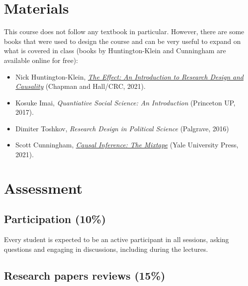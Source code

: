 \documentclass[12pt, a4paper]{article}
\begin{document}
\section{Materials}

This course does not follow any textbook in particular.
However, there are some books that were used to design the course and can be very useful to expand on what is covered in class (books by Huntington-Klein and Cunningham are available online for free):

\begin{itemize}
\setlength\itemsep{-5pt}
  \item Nick Huntington-Klein, \href{https://theeffectbook.net/}{\textit{The Effect: An Introduction to Research Design and Causality}} (Chapman and Hall/CRC, 2021).
  \item Kosuke Imai, \textit{Quantiative Social Science: An Introduction} (Princeton UP, 2017).
  \item Dimiter Toshkov, \textit{Research Design in Political Science} (Palgrave, 2016)
  \item Scott Cunningham, \href{https://mixtape.scunning.com/}{\textit{Causal Inference: The Mixtape}} (Yale University Press, 2021).
\end{itemize}


\section{Assessment}


\subsection*{Participation (10\%)}

Every student is expected to be an active participant in all sessions, asking questions and engaging in discussions, including during the lectures.

\subsection*{Research papers reviews (15\%)}
\end{document}
